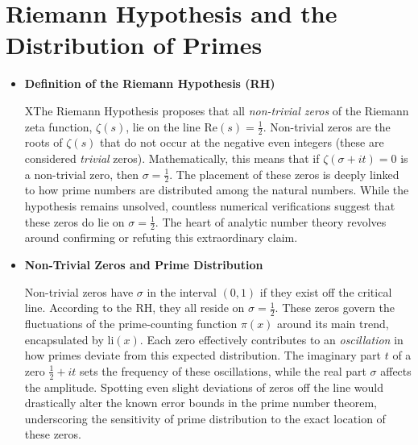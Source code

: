 \documentclass{article}
\begin{document}
\sloppy

\section*{Riemann Hypothesis and the Distribution of Primes}

\begin{itemize}
    \item \textbf{Definition of the Riemann Hypothesis (RH)} 
    \par 
    XThe Riemann Hypothesis proposes that all \textit{non-trivial zeros} of the Riemann zeta function, \(\zeta(s)\), lie on the line \(\text{Re}(s) = \frac{1}{2}\). Non-trivial zeros are the roots of \(\zeta(s)\) that do not occur at the negative even integers (these are considered \textit{trivial} zeros). Mathematically, this means that if \(\zeta(\sigma + it)=0\) is a non-trivial zero, then \(\sigma = \tfrac12\). The placement of these zeros is deeply linked to how prime numbers are distributed among the natural numbers. While the hypothesis remains unsolved, countless numerical verifications suggest that these zeros do lie on \(\sigma = \tfrac12\). The heart of analytic number theory revolves around confirming or refuting this extraordinary claim.
\end{itemize}

\begin{itemize}
    \item \textbf{Non-Trivial Zeros and Prime Distribution}
    \par
    Non-trivial zeros have \(\sigma\) in the interval \((0,1)\) if they exist off the critical line. According to the RH, they all reside on \(\sigma = \tfrac12\). These zeros govern the fluctuations of the prime-counting function \(\pi(x)\) around its main trend, encapsulated by \(\text{li}(x)\). Each zero effectively contributes to an \textit{oscillation} in how primes deviate from this expected distribution. The imaginary part \(t\) of a zero \(\tfrac12 + it\) sets the frequency of these oscillations, while the real part \(\sigma\) affects the amplitude. Spotting even slight deviations of zeros off the line would drastically alter the known error bounds in the prime number theorem, underscoring the sensitivity of prime distribution to the exact location of these zeros.
\end{itemize}
\end{document}
